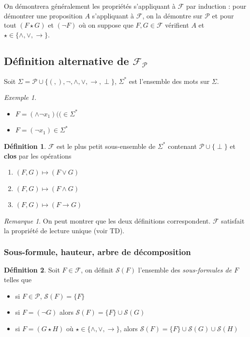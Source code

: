 \documentclass[]{article}
\theoremstyle{remark}
\newtheorem{myrem}{Remarque}
\newtheorem{myexmpl}{Exemple}
\theoremstyle{definition}
\newtheorem{mydef}{Définition}
\begin{document}
On démontrera généralement les propriétés s'appliquant à $\mathcal{F}$ par induction :
pour démontrer une proposition $A$ s'appliquant à $\mathcal{F}$, on la démontre sur $\mathcal{P}$ et pour tout $(F \star G)$ et $(\neg F)$ où on suppose que $F, G \in \mathcal{F}$ vérifient $A$ et $\star \in \{\land, \lor, \rightarrow\}.$

\subsection{Définition alternative de $\mathcal{F}_\mathcal{P}$}

Soit $\Sigma = \mathcal{P} \cup \{(, ), \neg, \land, \lor, \rightarrow, \perp \}$, $\Sigma^*$ est l'ensemble des mots sur $\Sigma$.

\begin{myexmpl}
	\leavevmode
	\begin{itemize}
		\item $F = (\land \neg x_1)(( \in \Sigma^*$
		\item $F = (\neg x_1) \in \Sigma^*$
	\end{itemize}
\end{myexmpl}

\begin{mydef}
	$\mathcal{F}$ est le plus petit sous-ensemble de $\Sigma^*$ contenant $\mathcal{P} \cup \{\perp\}$ et \textbf{clos} par les opérations
	\begin{enumerate}
		\item $(F, G) \longmapsto (F \lor G)$
		\item $(F, G) \longmapsto (F \land G)$
		\item $(F, G) \longmapsto (F \rightarrow G)$
	\end{enumerate}
\end{mydef}

\begin{myrem}
	On peut montrer que les deux définitions correspondent.
	$\mathcal{F}$ satisfait la propriété de lecture unique (voir TD). 
\end{myrem}

\subsubsection{Sous-formule, hauteur, arbre de décomposition}

\begin{mydef}
	Soit $F \in \mathcal{F}$, on définit $\mathcal{S}(F)$ l'ensemble des \textit{sous-formules de $F$} telles que
	
	\begin{itemize}
		\item si $F \in \mathcal{P}$, $\mathcal{S}(F) = \{F\}$
		\item si $F = (\neg G)$ alors $\mathcal{S}(F) = \{F \} \cup \mathcal{S}(G)$
		\item si $F = (G \star H)$ où $\star \in \{\land, \lor, \rightarrow \}$, alors $\mathcal{S}(F) = \{F\} \cup \mathcal{S}(G) \cup \mathcal{S}(H)$
	\end{itemize}
\end{mydef}
\end{document}
